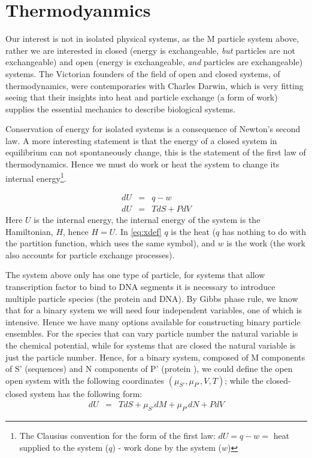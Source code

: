
\section{Thermodyanmics}
Our interest is not in isolated physical systems, as the M particle system above, rather we are interested in closed (energy is exchangeable, \textit{but} particles are not exchangeable) and open (energy is exchangeable, \textit{and} particles are exchangeable) systems.  The Victorian founders of the field of open and closed systems, of thermodynamics, were contemporaries with Charles Darwin, which is very fitting seeing that their insights into heat and particle exchange (a form of work) supplies the essential mechanics to describe biological systems.

Conservation of energy for isolated systems is a consequence of Newton's second law. A more interesting statement is that the energy of a closed system in equilibrium can not spontaneously change, this is the statement of the first law of thermodynamics.  Hence we must do work or heat the system to change its internal energy\footnote{The Clausius convention for the form of the first law: $dU = q -w =$ heat supplied to the system ($q$) - work done by the system ($w$)}. 

\begin{eqnarray}
  dU &=& q - w \label{eq:xdef} \\  \nonumber
  dU &=& TdS + PdV
\end{eqnarray}
 Here $U$ is the internal energy, the internal energy of the system is the Hamiltonian, $H$, hence $H=U$.  In \eqref{eq:xdef} $q$ is the heat ($q$ has nothing to do with the partition function, which uses the same symbol), and $w$ is the work (the work also accounts for particle exchange processes).    
      
 The system above only has one type of particle, for systems that allow transcription factor to bind to DNA segments it is necessary to introduce multiple particle species (the protein and DNA).  By Gibbs phase rule, we know that for a binary system we will need four independent variables, one of which is intensive.  Hence we have many options available for constructing binary particle ensembles.  For the species that can vary particle number the natural variable is the chemical potential, while for systems that are closed the natural variable is just the particle number.  Hence, for a binary system, composed of M components of S' (sequences) and N components of P' (protein ), we could define the open open system with the following coordinates $( \mu_{S'}, \mu_{P'},V,T)$; while the closed-closed system has the following form:
   \begin{eqnarray}
  dU &=& TdS + \mu_{S'} dM + \mu_{P'} dN + PdV
\end{eqnarray}\label{closedclosed} 
%
  
